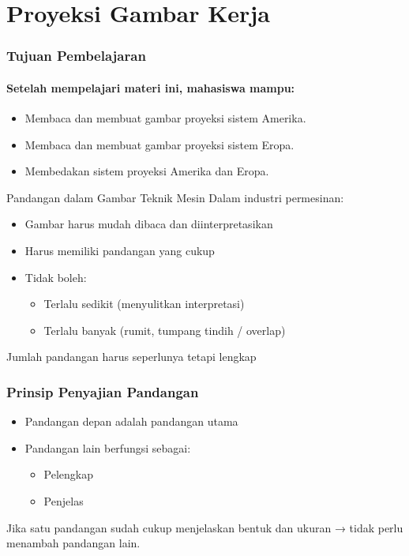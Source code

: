 \documentclass[../gbr_teknik.tex]{subfiles}
\begin{document}
\section{Proyeksi Gambar Kerja}%
\label{sec:Proyeksi Gambar Kerja}

\begin{frame}[mytitle=center,c,mycolor=digiPH_uniblue,light]\frametitle{Tujuan Pembelajaran}

	\framesubtitle{Setelah mempelajari materi ini, mahasiswa mampu:}
	\begin{itemize}
		\item Membaca dan membuat gambar proyeksi sistem Amerika.
		\item Membaca dan membuat gambar proyeksi sistem Eropa.
		\item Membedakan sistem proyeksi Amerika dan Eropa.
	\end{itemize}
\end{frame}

\begin{frame}[mytitle=center,c,mycolor=digiPH_cream,light]Pandangan dalam Gambar Teknik Mesin
	Dalam industri permesinan:

	\begin{itemize}
		\item Gambar harus mudah dibaca dan diinterpretasikan
		\item Harus memiliki pandangan yang cukup
		\item Tidak boleh:
		      \begin{itemize}
			      \item Terlalu sedikit (menyulitkan interpretasi)
			      \item Terlalu banyak (rumit, tumpang tindih / overlap)
		      \end{itemize}
	\end{itemize}


	\tabitem Jumlah pandangan harus seperlunya tetapi lengkap\end{frame}

\begin{frame}[mytitle=standard,c,mycolor=digiPH_leaf,dark]
	\frametitle{Prinsip Penyajian Pandangan}

	\begin{itemize}
		\item Pandangan depan adalah pandangan utama
		\item Pandangan lain berfungsi sebagai:
		      \begin{itemize}
			      \item Pelengkap
			      \item Penjelas
		      \end{itemize}
	\end{itemize}

	Jika satu pandangan sudah cukup menjelaskan bentuk dan ukuran → tidak perlu menambah pandangan lain.\end{frame}
\end{document}
